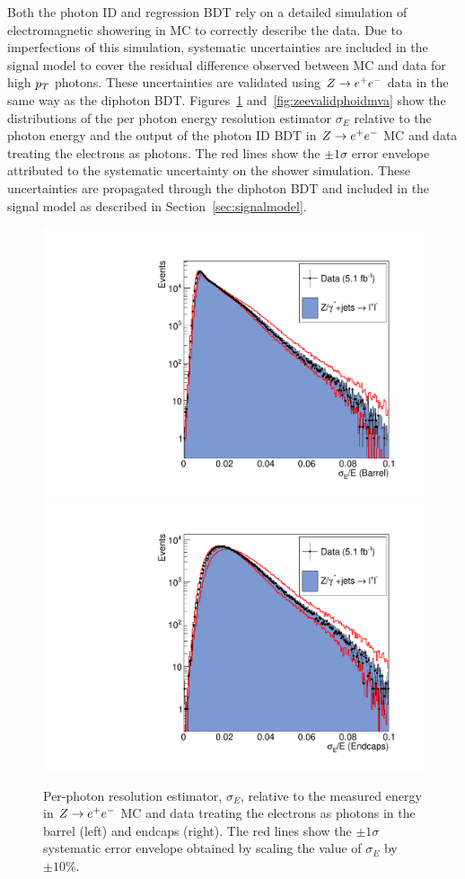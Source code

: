 Both the photon ID and regression BDT rely on a detailed simulation of electromagnetic showering  
in MC to correctly describe the data. Due to imperfections of this simulation, systematic
uncertainties are included in the signal model to cover the residual difference observed between MC and data
for high $p_{T}$ photons. 
These uncertainties are validated using $Z\rightarrow e^{+}e^{-}$ data in the same way as the diphoton BDT. 
Figures~\ref{fig:zeevalidsigmaE} and~\ref{fig:zeevalidphoidmva} show the distributions of the 
per photon energy resolution estimator $\sigma_{E}$ relative to the photon energy and the output of the 
photon ID BDT in $Z\rightarrow e^{+}e^{-}$ MC and data treating the electrons as photons. The red lines
show the $\pm 1\sigma$ error envelope attributed to the systematic uncertainty on the shower simulation.  
These uncertainties are propagated through the diphoton BDT and included in the signal model as described in 
Section~\ref{sec:signalmodel}.

\begin{figure}
  \includegraphics[width=.48\textwidth]{hgg7TeV/zeeValidation/sigmaE_EB.pdf}
  \includegraphics[width=.48\textwidth]{hgg7TeV/zeeValidation/sigmaE_EE.pdf}
\caption{Per-photon resolution estimator, $\sigma_{E}$, relative to the measured energy in $Z\rightarrow e^{+}e^{-}$ 
MC and data 
treating the electrons as photons in the barrel (left) and endcaps (right). 
The red lines show the $\pm 1\sigma$ systematic error envelope obtained by scaling the value of 
$\sigma_{E}$ by $\pm 10\%$.}
\label{fig:zeevalidsigmaE}
\end{figure}

